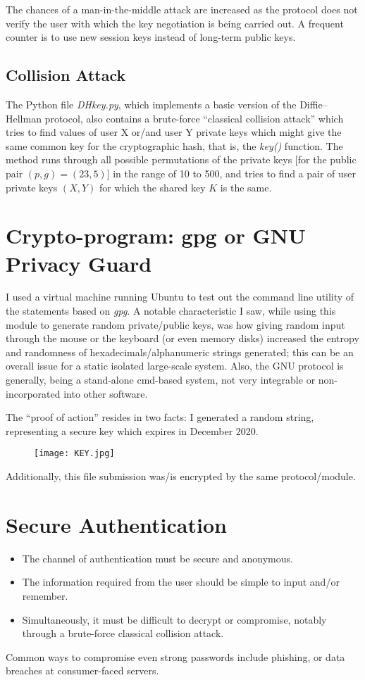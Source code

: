 \documentclass{report}
\begin{document}
The chances of a man-in-the-middle attack are increased as the protocol does not verify the user with which the key negotiation is being carried out. A frequent counter is to use new session keys instead of long-term public keys.
\subsection*{Collision Attack}
The Python file \textit{DHkey.py}, which implements a basic version of the Diffie–Hellman protocol, also contains a brute-force ``classical collision attack'' which tries to find values of user X or/and user Y private keys which might give the same common key for the cryptographic hash, that is, the \textit{key()} function. The method runs through all possible permutations of the private keys [for the public pair $(p, g) = (23, 5)$] in the range of 10 to 500, and tries to find a pair of user private keys $(X, Y)$ for which the shared key $K$ is the same.
\section*{Crypto-program: gpg or GNU Privacy Guard}
I used a virtual machine running Ubuntu to test out the command line utility of the statements based on \textit{gpg}. A notable characteristic I saw, while using this module to generate random private/public keys, was how giving random input through the mouse or the keyboard (or even memory disks) increased the entropy and randomness of hexadecimals/alphanumeric strings generated; this can be an overall issue for a static isolated large-scale system. Also, the GNU protocol is generally, being a stand-alone cmd-based system, not very integrable or non-incorporated into other software.

The ``proof of action'' resides in two facts: I generated a random string, representing a secure key which expires in December 2020.
\begin{figure}[H]
	\centering
	\texttt{[image: KEY.jpg]}
	\label{key}
\end{figure}
Additionally, this file submission was/is encrypted by the same protocol/module.
\section*{Secure Authentication}
\begin{itemize}
	\item The channel of authentication must be secure and anonymous.
	\item The information required from the user should be simple to input and/or remember.
	\item Simultaneously, it must be difficult to decrypt or compromise, notably through a brute-force classical collision attack.
\end{itemize}
Common ways to compromise even strong passwords include phishing, or data breaches at consumer-faced servers.
\end{document}
